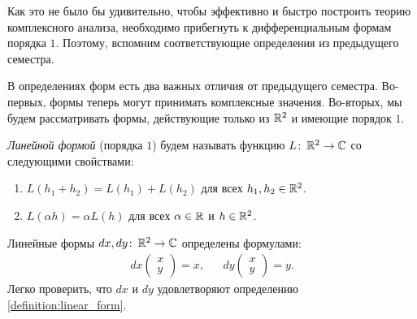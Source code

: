 \documentclass[../complex-analysis.tex]{subfiles}
\begin{document}
Как это не было бы удивительно, чтобы эффективно и быстро построить теорию комплексного анализа, необходимо прибегнуть к дифференциальным формам порядка $1$. Поэтому, вспомним соответствующие определения из предыдущего семестра.

В определениях форм есть два важных отличия от предыдущего семестра. Во-первых, формы теперь могут принимать комплексные значения. Во-вторых, мы будем рассматривать формы, действующие только из $\mathbb{R}^{2}$ и имеющие порядок $1$. 

\begin{df}
 \label{definition:linear_form}
 \textit{Линейной формой} (порядка $1$) будем называть функцию $L \colon\, \mathbb{R}^{2} \to \mathbb{C}$ со следующими свойствами:
 \begin{enumerate}
  \item $L(h_1 + h_2) = L(h_1) + L(h_2)$ для всех $h_1, h_2 \in \mathbb{R}^{2}$.
  \item \label{enum2:definition:linear_form} $L(\alpha h) = \alpha L(h)$ для всех $\alpha \in \mathbb{R}$ и $h \in \mathbb{R}^{2}$.

 \end{enumerate}
\end{df}
\begin{exmpl}
 Линейные формы $dx, dy \colon\, \mathbb{R}^{2} \to \mathbb{C}$ определены формулами:
 \begin{align*}
  dx \begin{pmatrix}
   x \\ y
   \end{pmatrix} = x, & &dy \begin{pmatrix}
   x \\ y
  \end{pmatrix} = y.
 \end{align*} Легко проверить, что $dx$ и $dy$ удовлетворяют определению \ref{definition:linear_form}.
\end{exmpl}
\end{document}
